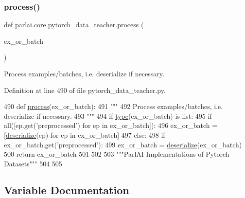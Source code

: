 \subsubsection{\texorpdfstring{process()}{process()}}
{\footnotesize\ttfamily def parlai.\+core.\+pytorch\+\_\+data\+\_\+teacher.\+process (\begin{DoxyParamCaption}\item[{}]{ex\+\_\+or\+\_\+batch }\end{DoxyParamCaption})}

\begin{DoxyVerb}Process examples/batches, i.e. deserialize if necessary.
\end{DoxyVerb}
 

Definition at line 490 of file pytorch\+\_\+data\+\_\+teacher.\+py.


\begin{DoxyCode}
490 \textcolor{keyword}{def }\hyperlink{namespaceparlai_1_1core_1_1pytorch__data__teacher_a7b71207eb86027bc93809c1e4d57f641}{process}(ex\_or\_batch):
491     \textcolor{stringliteral}{"""}
492 \textcolor{stringliteral}{    Process examples/batches, i.e. deserialize if necessary.}
493 \textcolor{stringliteral}{    """}
494     \textcolor{keywordflow}{if} \hyperlink{namespaceparlai_1_1agents_1_1tfidf__retriever_1_1build__tfidf_ad5dfae268e23f506da084a9efb72f619}{type}(ex\_or\_batch) \textcolor{keywordflow}{is} list:
495         \textcolor{keywordflow}{if} all([ep.get(\textcolor{stringliteral}{'preprocessed'}) \textcolor{keywordflow}{for} ep \textcolor{keywordflow}{in} ex\_or\_batch]):
496             ex\_or\_batch = [\hyperlink{namespaceparlai_1_1core_1_1pytorch__data__teacher_a0c6f08553514c14d037da194f9d112ae}{deserialize}(ep) \textcolor{keywordflow}{for} ep \textcolor{keywordflow}{in} ex\_or\_batch]
497     \textcolor{keywordflow}{else}:
498         \textcolor{keywordflow}{if} ex\_or\_batch.get(\textcolor{stringliteral}{'preprocessed'}):
499             ex\_or\_batch = \hyperlink{namespaceparlai_1_1core_1_1pytorch__data__teacher_a0c6f08553514c14d037da194f9d112ae}{deserialize}(ex\_or\_batch)
500     \textcolor{keywordflow}{return} ex\_or\_batch
501 
502 
503 \textcolor{stringliteral}{"""ParlAI Implementations of Pytorch Datasets"""}
504 
505 
\end{DoxyCode}


\subsection{Variable Documentation}
\mbox{\label{namespaceparlai_1_1core_1_1pytorch__data__teacher_a34008e5ea53ba69d5da10b59d55abef4}} 
